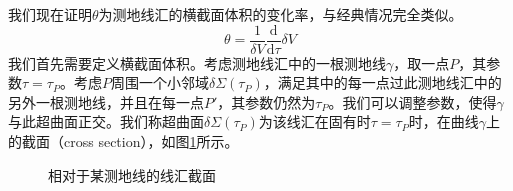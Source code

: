 \documentclass[hyperref, UTF8, a4paper]{ctexart}
\begin{document}
我们现在证明$\theta $为测地线汇的横截面体积的变化率，与经典情况完全类似。
\begin{equation*}
	\theta =\frac{1}{\delta V}\frac{\mathrm{d}}{\mathrm{d} \tau } \delta V
\end{equation*}
我们首先需要定义横截面体积。考虑测地线汇中的一根测地线$\gamma $，取一点$P$，其参数$\tau =\tau _{P}$。考虑$P$周围一个小邻域$\delta \Sigma ( \tau _{P})$，满足其中的每一点过此测地线汇中的另外一根测地线，并且在每一点$P'$，其参数仍然为$\tau _{P}$。我们可以调整参数，使得$\gamma $与此超曲面正交。我们称超曲面$\delta \Sigma ( \tau _{P})$为该线汇在固有时$\tau =\tau _{P}$时，在曲线$\gamma $上的截面（cross section），如图\ref{cross-section}所示。

\begin{figure}
	\centering
	
	\caption{相对于某测地线的线汇截面}
	\label{cross-section}
\end{figure}
\end{document}
